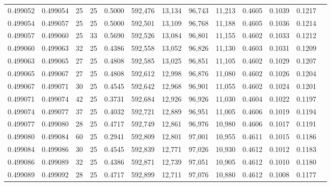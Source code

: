 \begin{tabular}{rrrrrrrrrrrrr}
0.499052 & 0.499054 &    25 &  25 &                                     0.5000 & 592,476 &  13,134 &  96,743 &  11,213 & 0.4605 & 0.1039 & 0.1217 \\
0.499054 & 0.499057 &    25 &  25 &                                     0.5000 & 592,501 &  13,109 &  96,768 &  11,188 & 0.4605 & 0.1036 & 0.1214 \\
0.499057 & 0.499060 &    25 &  33 &                                     0.5690 & 592,526 &  13,084 &  96,801 &  11,155 & 0.4602 & 0.1033 & 0.1212 \\
0.499060 & 0.499063 &    32 &  25 &                                     0.4386 & 592,558 &  13,052 &  96,826 &  11,130 & 0.4603 & 0.1031 & 0.1209 \\
0.499063 & 0.499065 &    27 &  25 &                                     0.4808 & 592,585 &  13,025 &  96,851 &  11,105 & 0.4602 & 0.1029 & 0.1207 \\
0.499065 & 0.499067 &    27 &  25 &                                     0.4808 & 592,612 &  12,998 &  96,876 &  11,080 & 0.4602 & 0.1026 & 0.1204 \\
0.499067 & 0.499071 &    30 &  25 &                                     0.4545 & 592,642 &  12,968 &  96,901 &  11,055 & 0.4602 & 0.1024 & 0.1201 \\
0.499071 & 0.499074 &    42 &  25 &                                     0.3731 & 592,684 &  12,926 &  96,926 &  11,030 & 0.4604 & 0.1022 & 0.1197 \\
0.499074 & 0.499077 &    37 &  25 &                                     0.4032 & 592,721 &  12,889 &  96,951 &  11,005 & 0.4606 & 0.1019 & 0.1194 \\
0.499077 & 0.499080 &    28 &  25 &                                     0.4717 & 592,749 &  12,861 &  96,976 &  10,980 & 0.4606 & 0.1017 & 0.1191 \\
0.499080 & 0.499084 &    60 &  25 &                                     0.2941 & 592,809 &  12,801 &  97,001 &  10,955 & 0.4611 & 0.1015 & 0.1186 \\
0.499084 & 0.499086 &    30 &  25 &                                     0.4545 & 592,839 &  12,771 &  97,026 &  10,930 & 0.4612 & 0.1012 & 0.1183 \\
0.499086 & 0.499089 &    32 &  25 &                                     0.4386 & 592,871 &  12,739 &  97,051 &  10,905 & 0.4612 & 0.1010 & 0.1180 \\
0.499089 & 0.499092 &    28 &  25 &                                     0.4717 & 592,899 &  12,711 &  97,076 &  10,880 & 0.4612 & 0.1008 & 0.1177 \\

\end{tabular}
